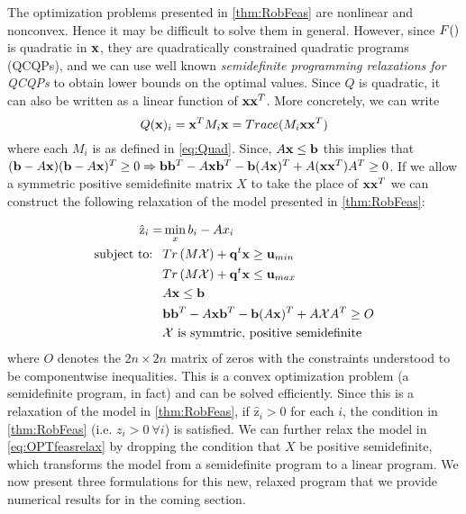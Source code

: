 

The optimization problems presented in \cref{thm:RobFeas} are nonlinear and nonconvex.
Hence it may be difficult to solve them in general.
However, since $F(\bold )$ is quadratic in $\bold x$, they are quadratically constrained quadratic programs (QCQPs), and we can use well known \emph{semidefinite programming relaxations for QCQPs} %
to obtain lower bounds on the optimal values.
Since $Q$ is quadratic, it can also be written as a linear function of $\bold x\bold x^T$.
More concretely, we can write
$$Q(\bold x)_i=\bold x^TM_i\bold x=Trace(M_i\bold x\bold x^T)$$
where each $M_i$ is as defined in \eqref{eq:Quad}. 
Since, $A\bold x\leq \bold b$ this implies that $(\bold b-A\bold x)(\bold b-A\bold x)^T\geq 0\Rightarrow \bold b\bold b^T-A\bold x\bold b^T-\bold b(A\bold x)^T+A(\bold x\bold x^T)A^T\geq 0$. 
If we allow a symmetric positive semidefinite matrix $X$ to take the place of $\bold x\bold x^T$ we can construct the following relaxation of the model presented in \cref{thm:RobFeas}:
 
\begin{subequations}\label{eq:OPTfeasrelax}
\begin{align}
\hat{\mathrm{z}}_{i} = &\min_x b_i-Ax_i  \\
 \text{subject to: } \ &Tr\left(M\mathcal{X}\right)+\bold q^t\bold x \geq \bold u_{min} \\
 & Tr\left(M\mathcal{X}\right)+\bold q^t\bold x \leq \bold u_{max} \\
 	&A\bold x\leq \bold b \\
 	&\bold b\bold b^T-A\bold x\bold b^T-\bold b(A\bold x)^T+A\mathcal{X}A^T\geq O \\
 	&\mathcal{X} \text{ is symmtric, positive semidefinite}
\end{align}
\end{subequations}
where $O$ denotes the $2n \times 2n$ matrix of zeros with the constraints understood to be componentwise inequalities. 
This is a convex optimization problem (a semidefinite program, in fact) and can be solved efficiently. 
Since this is a relaxation of the model in \cref{thm:RobFeas}, if $\hat{\mathrm{z}}_i>0$ for each $i$, the condition in \cref{thm:RobFeas} (i.e. $z_i>0 \ \forall i$) is satisfied. 
We can further relax the model in \eqref{eq:OPTfeasrelax} by dropping the condition that $X$ be positive semidefinite, which transforms the model from a semidefinite program to a linear program. 
We now present three formulations for this new, relaxed program that we provide numerical results for in the coming section.

